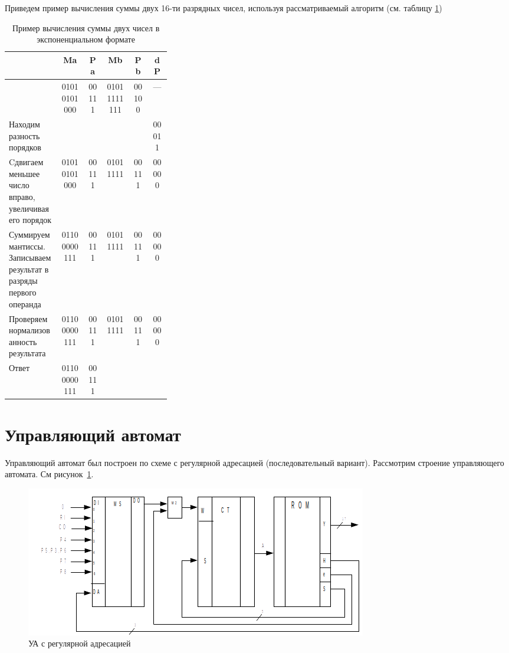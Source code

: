 \documentclass[a4paper,14pt]{extarticle}
\begin{document}
Приведем пример вычисления суммы двух 16-ти разрядных чисел, используя рассматриваемый алгоритм (см. таблицу \ref{tab:examplesum})
\begin{table}[htbp]

	\small
	\begin{center}
		\begin{tabular}{|m{0.32\linewidth}|c|c|c|c|c|}
			\hline
			& \textbf{Ma} & \textbf{Pa} & \textbf{Mb} & \textbf{Pb} & \textbf{dP} \\ \hline
			& 01010101000 & 00111 & 01011111111 & 00100 & --- \\ \hline
			Находим разность порядков & \multicolumn{1}{l|}{} & \multicolumn{1}{l|}{} &  &  & 00011 \\ \hline
			Cдвигаем меньшее число вправо, увеличивая его порядок & 01010101000 & 00111 & 01011111 & 00111 & 00000 \\ \hline
			Суммируем мантиссы. Записываем результат в разряды первого операнда & 01100000111 & 00111 & 01011111 & 00111 & 00000 \\ \hline
			Проверяем нормализованность результата& 01100000111 & 00111 & 01011111 & 00111 & 00000 \\ \hline
			Ответ & 01100000111 & 00111 &  &  &  \\ \hline
		\end{tabular}
	\end{center}
	\caption{Пример вычисления суммы двух чисел в экспоненциальном формате}
	\label{tab:examplesum}
\end{table}


\section{Управляющий автомат}

Управляющий автомат был построен по схеме с регулярной адресацией (последовательный вариант). Рассмотрим строение управляющего автомата. См рисунок~\ref{fig:courseschemema}.

\begin{figure}[h!]
	\centering
	\includegraphics[width=0.8\linewidth]{images/course_ma_temp}
	\caption{УА с регулярной адресацией}
	\label{fig:courseschemema}
\end{figure}
\end{document}
